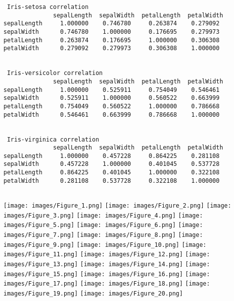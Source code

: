 \documentclass{article}
\begin{document}
\begin{verbatim}
 Iris-setosa correlation
              sepalLength  sepalWidth  petalLength  petalWidth
sepalLength     1.000000    0.746780     0.263874    0.279092
sepalWidth      0.746780    1.000000     0.176695    0.279973
petalLength     0.263874    0.176695     1.000000    0.306308
petalWidth      0.279092    0.279973     0.306308    1.000000 


 Iris-versicolor correlation
              sepalLength  sepalWidth  petalLength  petalWidth
sepalLength     1.000000    0.525911     0.754049    0.546461
sepalWidth      0.525911    1.000000     0.560522    0.663999
petalLength     0.754049    0.560522     1.000000    0.786668
petalWidth      0.546461    0.663999     0.786668    1.000000 


 Iris-virginica correlation
              sepalLength  sepalWidth  petalLength  petalWidth
sepalLength     1.000000    0.457228     0.864225    0.281108
sepalWidth      0.457228    1.000000     0.401045    0.537728
petalLength     0.864225    0.401045     1.000000    0.322108
petalWidth      0.281108    0.537728     0.322108    1.000000 


\end{verbatim}

\texttt{[image: images/Figure\_1.png]}
\texttt{[image: images/Figure\_2.png]}
\texttt{[image: images/Figure\_3.png]}
\texttt{[image: images/Figure\_4.png]}
\texttt{[image: images/Figure\_5.png]}
\texttt{[image: images/Figure\_6.png]}
\texttt{[image: images/Figure\_7.png]}
\texttt{[image: images/Figure\_8.png]}
\texttt{[image: images/Figure\_9.png]}
\texttt{[image: images/Figure\_10.png]}
\texttt{[image: images/Figure\_11.png]}
\texttt{[image: images/Figure\_12.png]}
\texttt{[image: images/Figure\_13.png]}
\texttt{[image: images/Figure\_14.png]}
\texttt{[image: images/Figure\_15.png]}
\texttt{[image: images/Figure\_16.png]}
\texttt{[image: images/Figure\_17.png]}
\texttt{[image: images/Figure\_18.png]}
\texttt{[image: images/Figure\_19.png]}
\texttt{[image: images/Figure\_20.png]}
\end{document}
